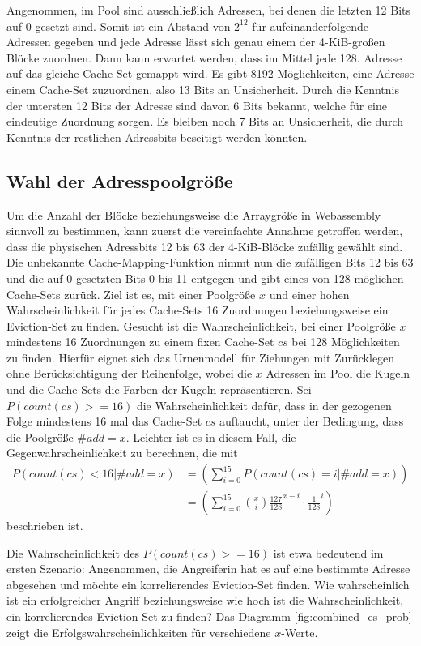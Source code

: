 Angenommen, im Pool sind ausschließlich Adressen, bei denen die letzten 12 Bits auf 0 gesetzt sind. 
Somit ist ein Abstand von $2^12$ für aufeinanderfolgende Adressen gegeben und jede Adresse lässt sich genau einem der 4-KiB-großen Blöcke zuordnen.
Dann kann erwartet werden, dass im Mittel jede 128. 
Adresse auf das gleiche Cache-Set gemappt wird. Es gibt 8192 Möglichkeiten, eine Adresse einem Cache-Set zuzuordnen, also 13 Bits an Unsicherheit.
Durch die Kenntnis der untersten 12 Bits der Adresse sind davon 6 Bits bekannt, welche für eine eindeutige Zuordnung sorgen. 
Es bleiben noch 7 Bits an Unsicherheit, die durch Kenntnis der restlichen Adressbits beseitigt werden könnten.

\subsection{Wahl der Adresspoolgröße}
\label{addressPoolSize}

Um die Anzahl der Blöcke beziehungsweise die Arraygröße in Webassembly sinnvoll zu bestimmen, kann zuerst die vereinfachte Annahme getroffen werden, dass die physischen Adressbits 12 bis 63 der 4-KiB-Blöcke zufällig gewählt sind. 
Die unbekannte Cache-Mapping-Funktion nimmt nun die zufälligen Bits 12 bis 63 und die auf 0 gesetzten Bits 0 bis 11 entgegen und gibt eines von 128 möglichen Cache-Sets zurück.
Ziel ist es, mit einer Poolgröße $x$ und einer hohen Wahrscheinlichkeit für jedes Cache-Sets 16 Zuordnungen beziehungsweise ein Eviction-Set zu finden.
Gesucht ist die Wahrscheinlichkeit, bei einer Poolgröße $x$ mindestens 16 Zuordnungen zu einem fixen Cache-Set $cs$ bei 128 Möglichkeiten zu finden.
Hierfür eignet sich das Urnenmodell für Ziehungen mit Zurücklegen ohne Berücksichtigung der Reihenfolge, wobei die $x$ Adressen im Pool die Kugeln und die Cache-Sets die Farben der Kugeln repräsentieren. Sei $P(count(cs)>=16)$ die Wahrscheinlichkeit dafür, dass in der gezogenen Folge mindestens 16 mal das Cache-Set $cs$ auftaucht, unter der Bedingung, dass die Poolgröße $\#add = x$.
Leichter ist es in diesem Fall, die Gegenwahrscheinlichkeit zu berechnen, die mit
\begin{align*}
P(count(cs)<16|\#add = x) &=
\left( \sum\limits_{i=0}^{15}P(count(cs)=i|\#add = x) \right) \\&=
\left( \sum\limits_{i=0}^{15} {x \choose i} \frac{127}{128}^{x-i} \cdot \frac{1}{128}^i  \right)
\end{align*}
beschrieben ist.

Die Wahrscheinlichkeit des $P(count(cs)>=16)$ ist etwa bedeutend im ersten Szenario:
Angenommen, die Angreiferin hat es auf eine bestimmte Adresse abgesehen und möchte ein korrelierendes Eviction-Set finden. 
Wie wahrscheinlich ist ein erfolgreicher Angriff beziehungsweise wie hoch ist die Wahrscheinlichkeit, ein korrelierendes Eviction-Set zu finden? 
Das Diagramm \ref{fig:combined_es_prob} zeigt die Erfolgswahrscheinlichkeiten für verschiedene $x$-Werte. 

